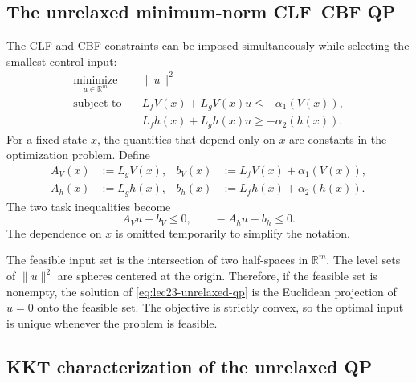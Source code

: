 \documentclass[../../master-handout.tex]{subfiles}
\begin{document}
\subsection{The unrelaxed minimum-norm CLF--CBF QP}

The CLF and CBF constraints can be imposed simultaneously while selecting the smallest control input:
\begin{equation}
\begin{aligned}
    \underset{u\in\mathbb{R}^{m}}{\operatorname{minimize}}
    \quad&
    \|u\|^{2}
    \\
    \text{subject to}
    \quad&
    L_fV(x)+L_gV(x)u
    \leq
    -\alpha_1\!\left(V(x)\right),
    \\
    &
    L_fh(x)+L_gh(x)u
    \geq
    -\alpha_2\!\left(h(x)\right).
\end{aligned}
\label{eq:lec23-unrelaxed-qp}
\end{equation}
For a fixed state $x$, the quantities that depend only on $x$ are constants in the optimization problem. Define
\begin{align}
    A_V(x)&:=L_gV(x),
    &
    b_V(x)&:=L_fV(x)+\alpha_1\!\left(V(x)\right),
    \label{eq:lec23-Av-bv}
    \\
    A_h(x)&:=L_gh(x),
    &
    b_h(x)&:=L_fh(x)+\alpha_2\!\left(h(x)\right).
    \label{eq:lec23-Ah-bh}
\end{align}
The two task inequalities become
\begin{equation}
    A_Vu+b_V\leq 0,
    \qquad
    -A_hu-b_h\leq 0.
    \label{eq:lec23-affine-constraints}
\end{equation}
The dependence on $x$ is omitted temporarily to simplify the notation.

The feasible input set is the intersection of two half-spaces in $\mathbb{R}^{m}$. The level sets of $\|u\|^2$ are spheres centered at the origin. Therefore, if the feasible set is nonempty, the solution of \eqref{eq:lec23-unrelaxed-qp} is the Euclidean projection of $u=0$ onto the feasible set. The objective is strictly convex, so the optimal input is unique whenever the problem is feasible.

\subsection{KKT characterization of the unrelaxed QP}
\end{document}
